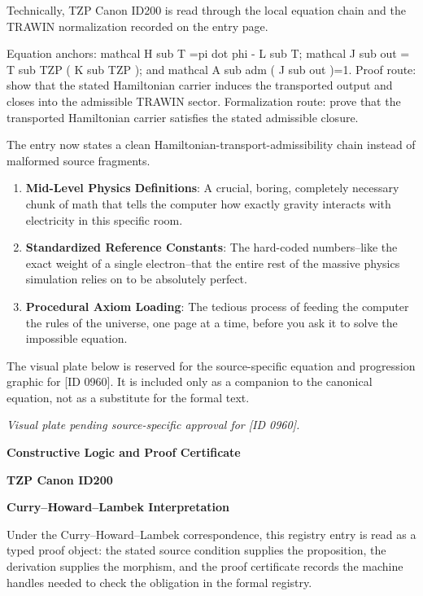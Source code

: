 Technically, TZP Canon ID200 is read through the local equation chain and the TRAWIN normalization recorded on the entry page.

Equation anchors: mathcal H sub T =pi dot phi - L sub T; mathcal J sub out = T sub TZP ( K sub TZP ); and mathcal A sub adm ( J sub out )=1. Proof route: show that the stated Hamiltonian carrier induces the transported output and closes into the admissible TRAWIN sector. Formalization route: prove that the transported Hamiltonian carrier satisfies the stated admissible closure.

The entry now states a clean Hamiltonian-transport-admissibility chain instead of malformed source fragments.
\endgroup

\begin{enumerate}[leftmargin=1.6em,itemsep=6pt,topsep=4pt]
\item \textbf{Mid-Level Physics Definitions}: A crucial, boring, completely necessary chunk of math that tells the computer how exactly gravity interacts with electricity in this specific room.
\item \textbf{Standardized Reference Constants}: The hard-coded numbers--like the exact weight of a single electron--that the entire rest of the massive physics simulation relies on to be absolutely perfect.
\item \textbf{Procedural Axiom Loading}: The tedious process of feeding the computer the rules of the universe, one page at a time, before you ask it to solve the impossible equation.
\end{enumerate}

\begingroup\footnotesize\sloppy
The visual plate below is reserved for the source-specific equation and progression graphic for [ID 0960]. It is included only as a companion to the canonical equation, not as a substitute for the formal text.
\par\endgroup
\begingroup\footnotesize\itshape
Visual plate pending source-specific approval for [ID 0960].
\par\endgroup

\clearpage
\begingroup\tzpsupportsetup
\noindent\textbf{\fontsize{10.8pt}{12.8pt}\selectfont [ID 0960] Constructive Logic and Proof Certificate}\par
\noindent\textbf{\fontsize{10pt}{12pt}\selectfont TZP Canon ID200}\par
\vspace{0.45em}
\begingroup
\footnotesize
\setlength{\parskip}{0.22em}
\setlength{\parindent}{0pt}
\noindent\textbf{Curry--Howard--Lambek Interpretation}\par
Under the Curry--Howard--Lambek correspondence, this registry entry is read as a typed proof
object: the stated source condition supplies the proposition, the derivation supplies the
morphism, and the proof certificate records the machine handles needed to check the obligation
in the formal registry.

